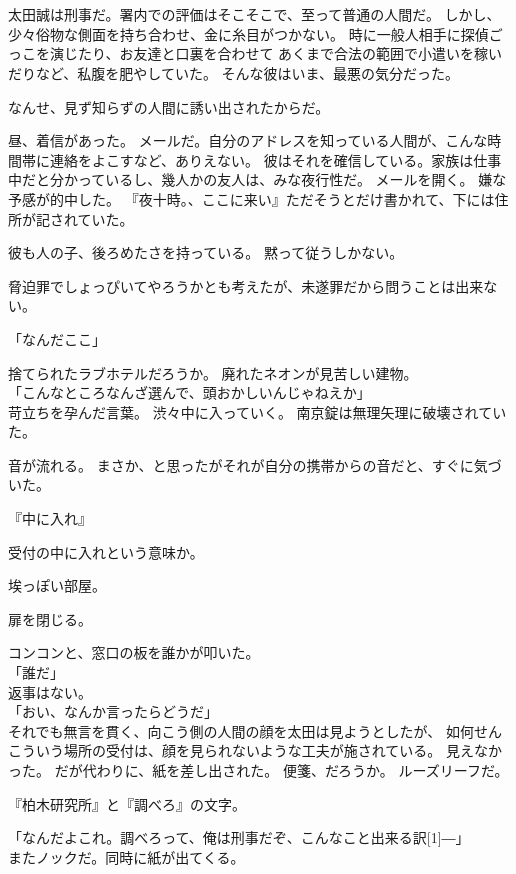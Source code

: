 \documentclass[../IHMain]{subfiles}
\begin{document}
\section{}
太田誠は刑事だ。署内での評価はそこそこで、至って普通の人間だ。
しかし、少々俗物な側面を持ち合わせ、金に糸目がつかない。
時に一般人相手に探偵ごっこを演じたり、お友達と口裏を合わせて
あくまで合法の範囲で小遣いを稼いだりなど、私腹を肥やしていた。
そんな彼はいま、最悪の気分だった。

なんせ、見ず知らずの人間に誘い出されたからだ。

昼、着信があった。
メールだ。自分のアドレスを知っている人間が、こんな時間帯に連絡をよこすなど、ありえない。
彼はそれを確信している。家族は仕事中だと分かっているし、幾人かの友人は、みな夜行性だ。
メールを開く。
嫌な予感が的中した。
『夜十時。、ここに来い』ただそうとだけ書かれて、下には住所が記されていた。

彼も人の子、後ろめたさを持っている。
黙って従うしかない。

脅迫罪でしょっぴいてやろうかとも考えたが、未遂罪だから問うことは出来ない。

「なんだここ」

捨てられたラブホテルだろうか。
廃れたネオンが見苦しい建物。\\
「こんなところなんざ選んで、頭おかしいんじゃねえか」\\
苛立ちを孕んだ言葉。
渋々中に入っていく。
南京錠は無理矢理に破壊されていた。

音が流れる。
まさか、と思ったがそれが自分の携帯からの音だと、すぐに気づいた。

『中に入れ』

受付の中に入れという意味か。

埃っぽい部屋。

扉を閉じる。

コンコンと、窓口の板を誰かが叩いた。\\
「誰だ」\\
返事はない。\\
「おい、なんか言ったらどうだ」\\
それでも無言を貫く、向こう側の人間の顔を太田は見ようとしたが、
如何せんこういう場所の受付は、顔を見られないような工夫が施されている。
見えなかった。
だが代わりに、紙を差し出された。
便箋、だろうか。
ルーズリーフだ。

『柏木研究所』と『調べろ』の文字。

「なんだよこれ。調べろって、俺は刑事だぞ、こんなこと出来る訳\scalebox{3}[1]{―}」\\
またノックだ。同時に紙が出てくる。
\end{document}
